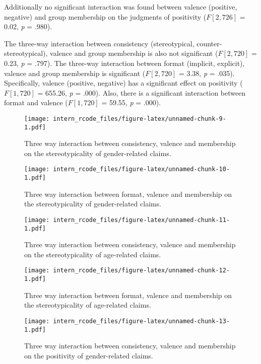 \documentclass[man]{apa6}
\begin{document}
Additionally no significant interaction was found between valence
(positive, negative) and group membership on the judgments of positivity
(\(F [2, 726]\) = 0.02, \emph{p} = .980).

The three-way interaction between consistency (stereotypical,
counter-stereotypical), valence and group membership is also not
significant (\(F [2, 720]\) = 0.23, \emph{p} = .797). The three-way
interaction between format (implicit, explicit), valence and group
membership is significant (\(F [2, 720]\) = 3.38, \emph{p} = .035).
Specifically, valence (positive, negative) has a significant effect on
positivity (\(F [1, 720]\) = 655.26, \emph{p} = .000). Also, there is a
significant interaction between format and valence (\(F [1, 720]\) =
59.55, \emph{p} = .000).

\begin{figure}
\centering
\texttt{[image: intern\_rcode\_files/figure-latex/unnamed-chunk-9-1.pdf]}
\caption{\label{fig:unnamed-chunk-9}Three way interaction between
consistency, valence and membership on the stereotypicality of
gender-related claims.}
\end{figure}

\begin{figure}
\centering
\texttt{[image: intern\_rcode\_files/figure-latex/unnamed-chunk-10-1.pdf]}
\caption{\label{fig:unnamed-chunk-10}Three way interaction between format,
valence and membership on the stereotypicality of gender-related
claims.}
\end{figure}

\begin{figure}
\centering
\texttt{[image: intern\_rcode\_files/figure-latex/unnamed-chunk-11-1.pdf]}
\caption{\label{fig:unnamed-chunk-11}Three way interaction between
consistency, valence and membership on the stereotypicality of
age-related claims.}
\end{figure}

\begin{figure}
\centering
\texttt{[image: intern\_rcode\_files/figure-latex/unnamed-chunk-12-1.pdf]}
\caption{\label{fig:unnamed-chunk-12}Three way interaction between format,
valence and membership on the stereotypicality of age-related claims.}
\end{figure}

\begin{figure}
\centering
\texttt{[image: intern\_rcode\_files/figure-latex/unnamed-chunk-13-1.pdf]}
\caption{\label{fig:unnamed-chunk-13}Three way interaction between
consistency, valence and membership on the positivity of gender-related
claims.}
\end{figure}
\end{document}
